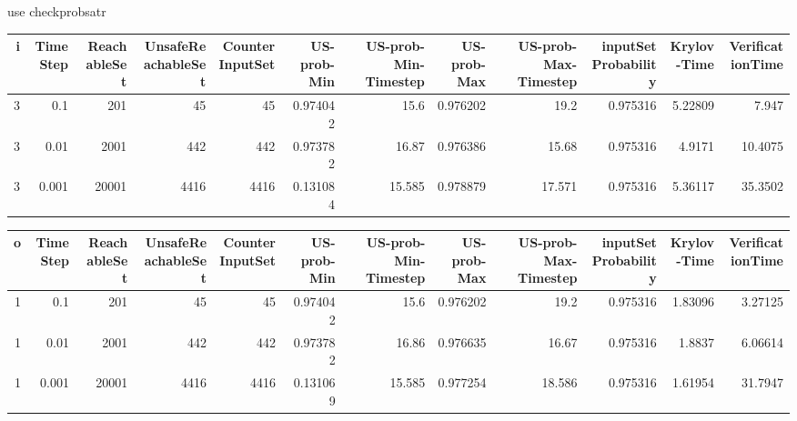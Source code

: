
use checkprobsatr
\begin{tabular}{rrrrrrrrrrrr}
\hline
   i &   TimeStep &   ReachableSet &   UnsafeReachableSet &   CounterInputSet &   US-prob-Min &   US-prob-Min-Timestep &   US-prob-Max &   US-prob-Max-Timestep &   inputSet Probability &   Krylov-Time &   VerificationTime \\
\hline
   3 &      0.1   &            201 &                   45 &                45 &      0.974042 &                 15.6   &      0.976202 &                 19.2   &               0.975316 &       5.22809 &             7.947  \\
   3 &      0.01  &           2001 &                  442 &               442 &      0.973782 &                 16.87  &      0.976386 &                 15.68  &               0.975316 &       4.9171  &            10.4075 \\
   3 &      0.001 &          20001 &                 4416 &              4416 &      0.131084 &                 15.585 &      0.978879 &                 17.571 &               0.975316 &       5.36117 &            35.3502 \\
\hline
\end{tabular}

\begin{tabular}{rrrrrrrrrrrr}
\hline
   o &   TimeStep &   ReachableSet &   UnsafeReachableSet &   CounterInputSet &   US-prob-Min &   US-prob-Min-Timestep &   US-prob-Max &   US-prob-Max-Timestep &   inputSet Probability &   Krylov-Time &   VerificationTime \\
\hline
   1 &      0.1   &            201 &                   45 &                45 &      0.974042 &                 15.6   &      0.976202 &                 19.2   &               0.975316 &       1.83096 &            3.27125 \\
   1 &      0.01  &           2001 &                  442 &               442 &      0.973782 &                 16.86  &      0.976635 &                 16.67  &               0.975316 &       1.8837  &            6.06614 \\
   1 &      0.001 &          20001 &                 4416 &              4416 &      0.131069 &                 15.585 &      0.977254 &                 18.586 &               0.975316 &       1.61954 &           31.7947  \\
\hline
\end{tabular}






